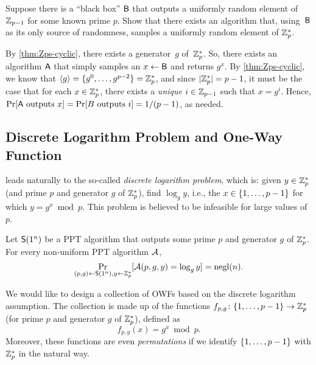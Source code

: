 \documentclass[11pt]{article}
\begin{document}
\begin{question}
  Suppose there is a ``black box'' \(\mathsf{B}\) that outputs a
  uniformly random element of \(\mathbb{Z}_{p-1}\) for some known prime
  \(p\). Show that there exists an algorithm that, using~\(\mathsf{B}\)
  as its only source of randomness, samples a uniformly random element
  of \(\mathbb{Z}_p^*\).
\end{question}

\begin{answer}
  By \cref{thm:Zps-cyclic}, there exists a generator~\(g\)
  of~\(\mathbb{Z}_p^{*}\). So, there exists an algorithm \(\mathsf{A}\) that
  simply samples an $x \gets \mathsf{B}$ and returns \(g^{x}\). By
  \cref{thm:Zps-cyclic}, we know that
  \(\langle g\rangle = \{g^0, \ldots, g^{p-2}\} = \mathbb{Z}_p^*\), and since
  \(\lvert\mathbb{Z}_p^*\rvert = p - 1\), it must be the case that for each
  \(x \in \mathbb{Z}_p^*\), there exists a \emph{unique} \(i \in \mathbb{Z}_{p-1}\)
  such that \(x = g^i\). Hence,
  \(\Pr[\mathsf{A} \text{ outputs } x] = \Pr[B \text{ outputs } i] =
  1/(p-1)\), as needed.
\end{answer}

\subsection{Discrete Logarithm Problem and One-Way Function}
\label{sec:dlp-owf}

 leads naturally to the so-called
\emph{discrete logarithm problem}, which is: given $y \in \mathbb{Z}_p^{*}$
(and prime $p$ and generator $g$ of $\mathbb{Z}_p^{*}$), find $\log_{g} y$,
i.e., the $x \in \{1, \ldots, p-1\}$ for which $y = g^{x} \bmod p$.
This problem is believed to be infeasible for large values of $p$.

\begin{conjecture}
  Let $\mathsf{S}(1^{n})$ be a PPT algorithm that outputs some prime $p$
  and generator $g$ of $\mathbb{Z}_p^{*}$.  For every non-uniform PPT algorithm
  $\mathcal{A}$, \[ \Pr_{(p,g) \gets \mathsf{S}(1^{n}), y \gets \mathbb{Z}_p^{*}}
  [\mathcal{A}(p,g,y) = \log_{g} y] = \operatorname{negl}(n). \]
\end{conjecture}

We would like to design a collection of OWFs based on the discrete
logarithm assumption.  The collection is made up of the functions
$f_{p,g} \colon \{1, \ldots, p-1\} \to \mathbb{Z}_p^{*}$ (for prime $p$ and
generator $g$ of $\mathbb{Z}_p^{*}$), defined as
\[ f_{p,g}(x) = g^{x} \bmod p. \] Moreover, these functions are even
\emph{permutations} if we identify $\{1, \ldots, p-1\}$ with
$\mathbb{Z}_p^{*}$ in the natural way.
\end{document}
